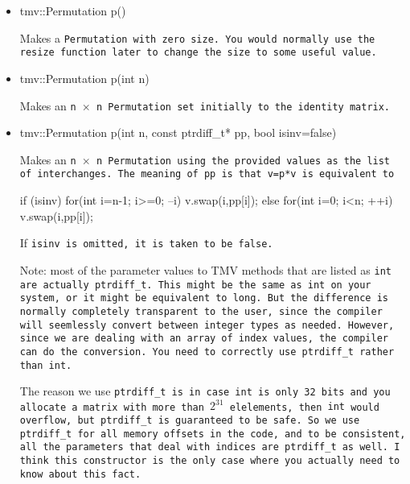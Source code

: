 \begin{itemize}

\item
\begin{tmvcode}
tmv::Permutation p()
\end{tmvcode}
Makes a \tt{Permutation} with zero size.  You would normally use the \tt{resize} function later to
change the size to some useful value.

\item 
\begin{tmvcode}
tmv::Permutation p(int n)
\end{tmvcode}
Makes an \tt{n} $\times$ \tt{n} \tt{Permutation} set initially to the identity matrix.

\item
\begin{tmvcode}
tmv::Permutation p(int n, const ptrdiff_t* pp, bool isinv=false)
\end{tmvcode}
Makes an \tt{n} $\times$ \tt{n} \tt{Permutation} using the provided values as the 
list of interchanges.  The meaning of \tt{pp} is that \tt{v=p*v} is equivalent to
\begin{tmvcode}
if (isinv) {
    for(int i=n-1; i>=0; --i) v.swap(i,pp[i]);
} else {
    for(int i=0; i<n; ++i) v.swap(i,pp[i]);
}
\end{tmvcode}
If \tt{isinv} is omitted, it is taken to be \tt{false}.

Note: most of the parameter values to TMV methods that are listed as
\tt{int} are actually \tt{ptrdiff\_t}.  This might be the same as \tt{int} on your system, or it might be equivalent to \tt{long}.  But the difference is normally completely transparent to the user, since the compiler will seemlessly convert between integer types as needed.  However, since we are dealing with an array of index values, the compiler can do the conversion.  You need to correctly use \tt{ptrdiff\_t} rather than \tt{int}.

The reason we use \tt{ptrdiff\_t} is in case \tt{int} is only 32 bits and you allocate a matrix with more than $2^{31}$ elelements, then \tt{int} would overflow, but \tt{ptrdiff\_t} is guaranteed to be safe.  So we use \tt{ptrdiff\_t} for all memory offsets in the code, and to be consistent, all the parameters that deal with indices are \tt{ptrdiff\_t} as well.  I think this constructor is the only case where you actually need to know about this fact.

\end{itemize}


